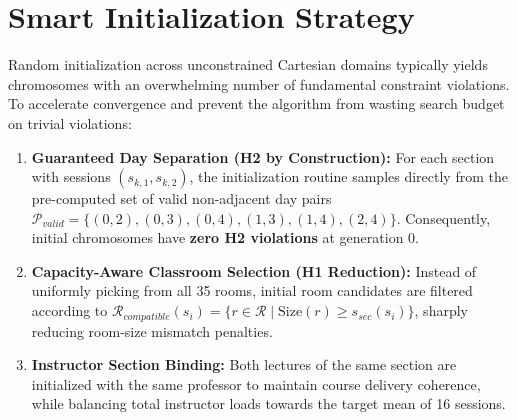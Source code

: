 \section{Smart Initialization Strategy}
Random initialization across unconstrained Cartesian domains typically yields chromosomes with an overwhelming number of fundamental constraint violations. To accelerate convergence and prevent the algorithm from wasting search budget on trivial violations:
\begin{enumerate}[leftmargin=1.5em]
  \item \textbf{Guaranteed Day Separation (H2 by Construction):}
  For each section with sessions $(s_{k, 1}, s_{k, 2})$, the initialization routine samples directly from the pre-computed set of valid non-adjacent day pairs $\mathcal{P}_{valid} = \{(0, 2), (0, 3), (0, 4), (1, 3), (1, 4), (2, 4)\}$. Consequently, initial chromosomes have \textbf{zero H2 violations} at generation 0.
  \item \textbf{Capacity-Aware Classroom Selection (H1 Reduction):}
  Instead of uniformly picking from all 35 rooms, initial room candidates are filtered according to $\mathcal{R}_{compatible}(s_i) = \{r \in \mathcal{R} \mid \text{Size}(r) \ge s_{sec}(s_i)\}$, sharply reducing room-size mismatch penalties.
  \item \textbf{Instructor Section Binding:}
  Both lectures of the same section are initialized with the same professor to maintain course delivery coherence, while balancing total instructor loads towards the target mean of 16 sessions.
\end{enumerate}
